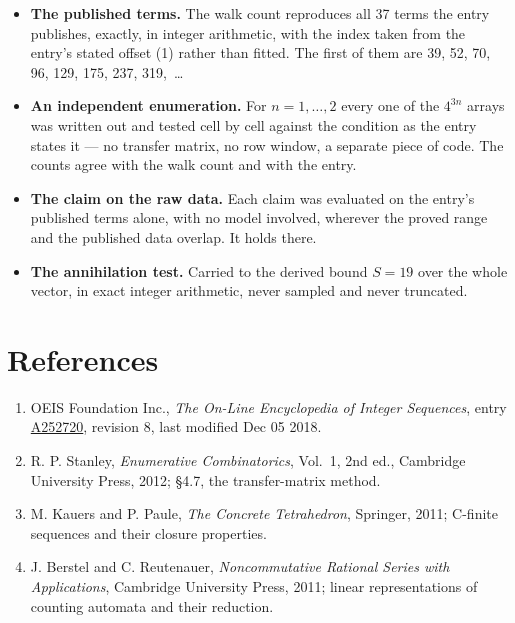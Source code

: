 \documentclass[11pt]{article}
\theoremstyle{definition}
\begin{document}
\begin{itemize}

\item {\bfseries The published terms.} The walk count reproduces all 37 terms the entry publishes, exactly, in integer arithmetic, with the index taken from the entry's stated offset (1) rather than fitted. The first of them are 39, 52, 70, 96, 129, 175, 237, 319,~\dots

\item {\bfseries An independent enumeration.} For $n = 1,\dots,2$ every one of the $4^{3n}$ arrays was written out and tested cell by cell against the condition as the entry states it --- no transfer matrix, no row window, a separate piece of code. The counts agree with the walk count and with the entry.

\item {\bfseries The claim on the raw data.} Each claim was evaluated on the entry's published terms alone, with no model involved, wherever the proved range and the published data overlap. It holds there.

\item {\bfseries The annihilation test.} Carried to the derived bound $S = 19$ over the whole vector, in exact integer arithmetic, never sampled and never truncated.

\end{itemize}

\section{References}

\begin{enumerate}

\item OEIS Foundation Inc., \emph{The On-Line Encyclopedia of Integer Sequences}, entry \href{https://oeis.org/A252720}{A252720}, revision 8, last modified Dec 05 2018.

\item R. P. Stanley, \emph{Enumerative Combinatorics}, Vol.~1, 2nd ed., Cambridge University Press, 2012; \S4.7, the transfer-matrix method.

\item M. Kauers and P. Paule, \emph{The Concrete Tetrahedron}, Springer, 2011; C-finite sequences and their closure properties.

\item J. Berstel and C. Reutenauer, \emph{Noncommutative Rational Series with Applications}, Cambridge University Press, 2011; linear representations of counting automata and their reduction.

\end{enumerate}
\end{document}
